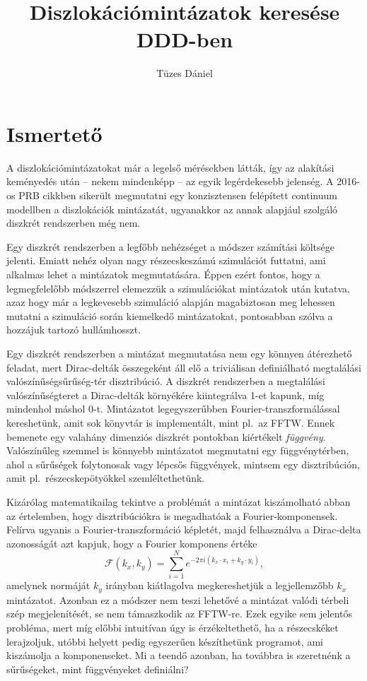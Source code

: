 \documentclass[10pt,a4paper]{scrartcl}
\title{Diszlokációmintázatok keresése DDD-ben}
\author{Tüzes Dániel}
\begin{document}
\maketitle
\tableofcontents

\section{Ismertető}
A diszlokációmintázatokat már a legelső mérésekben látták, így az alakítási keményedés után -- nekem mindenképp -- az egyik legérdekesebb jelenség. A 2016-os PRB cikkben sikerült megmutatni egy konzisztensen felépített continuum modellben a diszlokációk mintázatát, ugyanakkor az annak alapjául szolgáló diszkrét rendszerben még nem.

Egy diszkrét rendszerben a legfőbb nehézséget a módszer számítási költsége jelenti. Emiatt nehéz olyan nagy részecskeszámú szimulációt futtatni, ami alkalmas lehet a mintázatok megmutatására. Éppen ezért fontos, hogy a legmegfelelőbb módszerrel elemezzük a szimulációkat mintázatok után kutatva, azaz hogy már a legkevesebb szimuláció alapján magabiztosan meg lehessen mutatni a szimuláció során kiemelkedő mintázatokat, pontosabban szólva a hozzájuk tartozó hullámhosszt.

Egy diszkrét rendszerben a mintázat megmutatása nem egy könnyen átérezhető feladat, mert Dirac-delták összegeként áll elő a triviálisan definiálható megtalálási valószínűségsűrűség-tér disztribúció. A diszkrét rendszerben a megtalálási valószínűségteret a Dirac-delták környékére kiintegrálva 1-et kapunk, míg mindenhol máshol 0-t. Mintázatot legegyszerűbben Fourier-transzformálással kereshetünk, amit sok könyvtár is implementált, mint pl.\ az FFTW. Ennek bemenete egy valahány dimenziós diszkrét pontokban kiértékelt \textit{függvény}. Valószínűleg szemmel is könnyebb mintázatot megmutatni egy függvénytérben, ahol a sűrűségek folytonosak vagy lépcsős függvények, mintsem egy disztribúción, amit pl.\ részecskepötyökkel szemléltethetünk.

Kizárólag matematikailag tekintve a problémát a mintázat kiszámolható abban az értelemben, hogy disztribúciókra is megadhatóak a Fourier-komponensek. Felírva ugyanis a Fourier-transzformáció képletét, majd felhasználva a Dirac-delta azonosságát azt kapjuk, hogy a Fourier komponens értéke
\[\mathcal{F}\left( {{k_x},{k_y}} \right) = \sum\limits_{i = 1}^N {{e^{ - 2\pi i\left( {{k_x} \cdot {x_i} + {k_y} \cdot {y_i}} \right)}}},\]
amelynek normáját ${{k_y}}$ irányban kiátlagolva megkereshetjük a legjellemzőbb ${{k_x}}$ mintázatot. Azonban ez a módszer nem teszi lehetővé a mintázat valódi térbeli szép megjelenítését, se nem támaszkodik az FFTW-re. Ezek egyike sem jelentős probléma, mert míg előbbi intuitívan úgy is érzékeltethető, ha a részecskéket lerajzoljuk, utóbbi helyett pedig egyszerűen készíthetünk programot, ami kiszámolja a komponenseket. Mi a teendő azonban, ha továbbra is szeretnénk a sűrűségeket, mint függvényeket definiálni?
\end{document}
